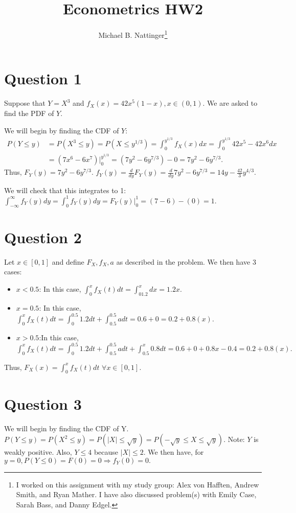 \documentclass[11pt]{article} %
\title{Econometrics HW2}
\author{Michael B. Nattinger\footnote{I worked on this assignment with my study group: Alex von Hafften, Andrew Smith, and Ryan Mather. I have also discussed problem(s) with Emily Case, Sarah Bass, and Danny Edgel.}}
\begin{document}
\maketitle

\section{Question 1}
Suppose that $Y = X^{3}$ and $f_X(x) = 42x^5(1-x), x \in (0,1).$ We are asked to find the PDF of $Y$.

We will begin by finding the CDF of $Y$:
\begin{align*}
P(Y\leq y) &= P(X^{3} \leq y) = P(X \leq y^{1/3}) = \int_0^{y^{1/3}} f_X(x)dx =  \int_0^{y^{1/3}}42x^5 - 42x^6dx \\
&= (7x^6 - 6x^7)|^{y^{1/3}}_{0} = (7y^2 - 6y^{7/3}) - 0 = 7y^2 - 6y^{7/3}.
\end{align*}
Thus, $F_Y(y) =  7y^2 - 6y^{7/3}$. $f_Y(y) = \frac{d}{dy} F_Y(y) =  \frac{d}{dy} 7y^2 - 6y^{7/3} = 14y - \frac{42}{3}y^{4/3}$.

We will check that this integrates to 1:
$\int_{-\infty}^{\infty} f_Y(y)dy = \int_0^1f_Y(y)dy = F_Y(y)|^{1}_{0} = (7 - 6) - (0) = 1. $

\section{Question 2}
Let $x \in [0,1]$ and define $F_X,f_X,a$ as described in the problem. We then have 3 cases:

\begin{itemize}
\item $x<0.5$: In this case, $\int^{x}_0 f_X(t)dt = \int^{x}_01.2 dx = 1.2x.$
\item $x=0.5$: In this case,  $\int^{x}_0 f_X(t)dt = \int^{0.5}_0 1.2dt + \int^{0.5}_{0.5} a dt = 0.6 + 0 = 0.2+0.8(x).$
\item $x>0.5$:In this case,  $\int^{x}_0 f_X(t)dt = \int^{0.5}_0 1.2dt + \int^{0.5}_{0.5} a dt + \int^{x}_{0.5} 0.8 dt = 0.6 + 0 + 0.8x - 0.4 = 0.2+0.8(x).$
\end{itemize}

Thus, $F_X(x) = \int_0^x f_X(t)dt$ $\forall x \in [0,1].$

\section{Question 3}
We will begin by finding the CDF of Y. $P(Y\leq y) = P(X^2 \leq y) = P(|X| \leq \sqrt{y}) = P(-\sqrt{y}\leq X \leq \sqrt{y})$. Note: $Y$ is weakly positive. Also, $Y\leq 4$ because $|X| \leq 2. $ We then have, for $y=0, P(Y\leq 0) = F(0) = 0 \Rightarrow f_Y(0) = 0.$
\end{document}
